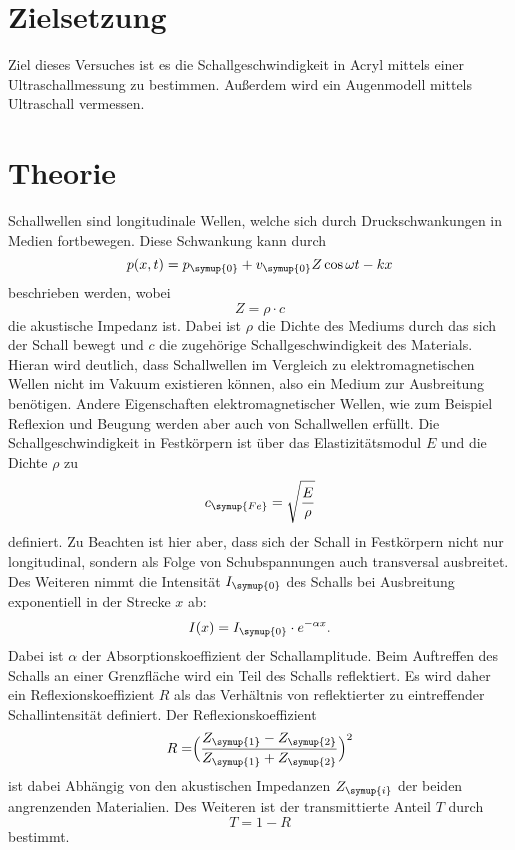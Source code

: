 \section{Zielsetzung}
    Ziel dieses Versuches ist es die Schallgeschwindigkeit in Acryl mittels einer Ultraschallmessung zu bestimmen. Außerdem wird ein Augenmodell
    mittels Ultraschall vermessen.
\section{Theorie}
\label{sec:Theorie}
    Schallwellen sind longitudinale Wellen, welche sich durch Druckschwankungen in Medien fortbewegen. Diese Schwankung kann durch
    \begin{equation}
    \label{eqn:welle}
        p(x,t) = p_{\symup{0}} + v_{\symup{0}} Z \cos{\omega t - k x}
    \end{equation}
    beschrieben werden, wobei 
    \begin{equation}
    \label{eqn:impedanz}
        Z = \rho \cdot c
    \end{equation}
    die akustische Impedanz ist. Dabei ist $\rho$ die 
    Dichte des Mediums durch das sich der Schall bewegt
    und $c$ die zugehörige Schallgeschwindigkeit des
    Materials. Hieran wird deutlich, dass Schallwellen im 
    Vergleich zu elektromagnetischen Wellen nicht im Vakuum existieren können, also ein Medium zur Ausbreitung benötigen.
    Andere Eigenschaften elektromagnetischer Wellen, wie zum Beispiel
    Reflexion und Beugung werden aber auch von Schallwellen 
    erfüllt. Die Schallgeschwindigkeit in Festkörpern
    ist über das Elastizitätsmodul $E$ und die Dichte 
    $\rho$ zu 
    \begin{equation}
    \label{eqn:schallgeschw_festkoerper}
        c_{\symup{Fe}} = \sqrt{\frac{E}{\rho}}
    \end{equation}
    definiert. Zu Beachten ist hier aber, dass sich der 
    Schall in Festkörpern nicht nur longitudinal, sondern 
    als Folge von Schubspannungen auch transversal ausbreitet.
    Des Weiteren nimmt die Intensität $I_{\symup{0}}$ des Schalls bei Ausbreitung
    exponentiell in der Strecke $x$ ab:  
    \begin{equation}
    \label{eqn:abnahme}     
        I(x) = I_{\symup{0}} \cdot e^{-\alpha x}.
    \end{equation}
    Dabei ist $\alpha$ der Absorptionskoeffizient
    der Schallamplitude. 
    Beim Auftreffen des Schalls an einer Grenzfläche wird 
    ein Teil des Schalls reflektiert. Es wird daher ein 
    Reflexionskoeffizient $R$ als das Verhältnis von 
    reflektierter zu eintreffender Schallintensität definiert.
    Der Reflexionskoeffizient
    \begin{equation}
    \label{eqn:reflexionskoeffizient}
    R = \Bigr ( \frac{Z_{\symup{1}} - Z_{\symup{2}}} {Z_{\symup{1}} + Z_{\symup{2}}}   \Bigl)^2
    \end{equation}
    ist dabei Abhängig von den akustischen Impedanzen $Z_{\symup{i}}$
    der beiden angrenzenden Materialien.
    Des Weiteren ist der transmittierte Anteil $T$ durch
    \begin{equation}
    \label{eqn:transmission}
        T = 1 - R 
    \end{equation}
    bestimmt.

